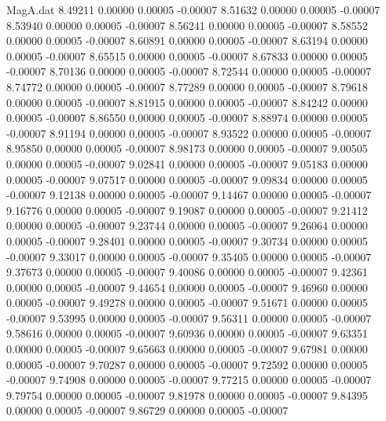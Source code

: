\begin{filecontents}{MagA.dat}
   8.49211    0.00000    0.00005   -0.00007
   8.51632    0.00000    0.00005   -0.00007
   8.53940    0.00000    0.00005   -0.00007
   8.56241    0.00000    0.00005   -0.00007
   8.58552    0.00000    0.00005   -0.00007
   8.60891    0.00000    0.00005   -0.00007
   8.63194    0.00000    0.00005   -0.00007
   8.65515    0.00000    0.00005   -0.00007
   8.67833    0.00000    0.00005   -0.00007
   8.70136    0.00000    0.00005   -0.00007
   8.72544    0.00000    0.00005   -0.00007
   8.74772    0.00000    0.00005   -0.00007
   8.77289    0.00000    0.00005   -0.00007
   8.79618    0.00000    0.00005   -0.00007
   8.81915    0.00000    0.00005   -0.00007
   8.84242    0.00000    0.00005   -0.00007
   8.86550    0.00000    0.00005   -0.00007
   8.88974    0.00000    0.00005   -0.00007
   8.91194    0.00000    0.00005   -0.00007
   8.93522    0.00000    0.00005   -0.00007
   8.95850    0.00000    0.00005   -0.00007
   8.98173    0.00000    0.00005   -0.00007
   9.00505    0.00000    0.00005   -0.00007
   9.02841    0.00000    0.00005   -0.00007
   9.05183    0.00000    0.00005   -0.00007
   9.07517    0.00000    0.00005   -0.00007
   9.09834    0.00000    0.00005   -0.00007
   9.12138    0.00000    0.00005   -0.00007
   9.14467    0.00000    0.00005   -0.00007
   9.16776    0.00000    0.00005   -0.00007
   9.19087    0.00000    0.00005   -0.00007
   9.21412    0.00000    0.00005   -0.00007
   9.23744    0.00000    0.00005   -0.00007
   9.26064    0.00000    0.00005   -0.00007
   9.28401    0.00000    0.00005   -0.00007
   9.30734    0.00000    0.00005   -0.00007
   9.33017    0.00000    0.00005   -0.00007
   9.35405    0.00000    0.00005   -0.00007
   9.37673    0.00000    0.00005   -0.00007
   9.40086    0.00000    0.00005   -0.00007
   9.42361    0.00000    0.00005   -0.00007
   9.44654    0.00000    0.00005   -0.00007
   9.46960    0.00000    0.00005   -0.00007
   9.49278    0.00000    0.00005   -0.00007
   9.51671    0.00000    0.00005   -0.00007
   9.53995    0.00000    0.00005   -0.00007
   9.56311    0.00000    0.00005   -0.00007
   9.58616    0.00000    0.00005   -0.00007
   9.60936    0.00000    0.00005   -0.00007
   9.63351    0.00000    0.00005   -0.00007
   9.65663    0.00000    0.00005   -0.00007
   9.67981    0.00000    0.00005   -0.00007
   9.70287    0.00000    0.00005   -0.00007
   9.72592    0.00000    0.00005   -0.00007
   9.74908    0.00000    0.00005   -0.00007
   9.77215    0.00000    0.00005   -0.00007
   9.79754    0.00000    0.00005   -0.00007
   9.81978    0.00000    0.00005   -0.00007
   9.84395    0.00000    0.00005   -0.00007
   9.86729    0.00000    0.00005   -0.00007

\end{filecontents}
